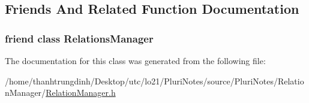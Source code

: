 \subsection{Friends And Related Function Documentation}
\subsubsection[{\texorpdfstring{Relations\+Manager}{RelationsManager}}]{\setlength{\rightskip}{0pt plus 5cm}friend class {\bf Relations\+Manager}\hspace{0.3cm}{\ttfamily [friend]}}\hypertarget{classRelationsManager_1_1Const__Iterator_ac617894445bd4f12c905741b1b4f9f6a}{}\label{classRelationsManager_1_1Const__Iterator_ac617894445bd4f12c905741b1b4f9f6a}


The documentation for this class was generated from the following file\+:\begin{DoxyCompactItemize}
\item 
/home/thanhtrungdinh/\+Desktop/utc/lo21/\+Pluri\+Notes/source/\+Pluri\+Notes/\+Relation\+Manager/\hyperlink{RelationManager_8h}{Relation\+Manager.\+h}\end{DoxyCompactItemize}

